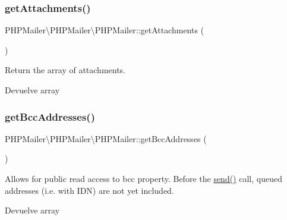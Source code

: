 \subsubsection{\texorpdfstring{get\+Attachments()}{getAttachments()}}
{\footnotesize\ttfamily P\+H\+P\+Mailer\textbackslash{}\+P\+H\+P\+Mailer\textbackslash{}\+P\+H\+P\+Mailer\+::get\+Attachments (\begin{DoxyParamCaption}{ }\end{DoxyParamCaption})}

Return the array of attachments.

\begin{DoxyReturn}{Devuelve}
array 
\end{DoxyReturn}
\mbox{\label{classPHPMailer_1_1PHPMailer_1_1PHPMailer_af5fdaf699d24949720adc5058ab20b4e}} 
\subsubsection{\texorpdfstring{get\+Bcc\+Addresses()}{getBccAddresses()}}
{\footnotesize\ttfamily P\+H\+P\+Mailer\textbackslash{}\+P\+H\+P\+Mailer\textbackslash{}\+P\+H\+P\+Mailer\+::get\+Bcc\+Addresses (\begin{DoxyParamCaption}{ }\end{DoxyParamCaption})}

Allows for public read access to \textquotesingle{}bcc\textquotesingle{} property. Before the \hyperlink{classPHPMailer_1_1PHPMailer_1_1PHPMailer_a80ad2451096e940360c7439c22303edf}{send()} call, queued addresses (i.\+e. with I\+DN) are not yet included.

\begin{DoxyReturn}{Devuelve}
array 
\end{DoxyReturn}
\mbox{\label{classPHPMailer_1_1PHPMailer_1_1PHPMailer_a811b6fed7b4acf9f4de590df96ebdc24}} 
